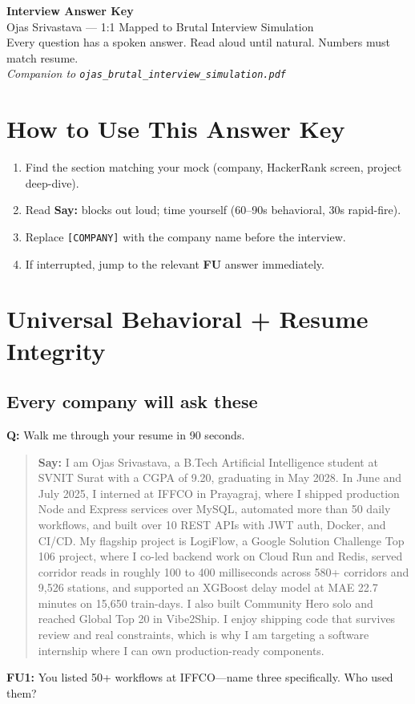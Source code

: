 \documentclass[9pt,a4paper]{article}
\begin{document}
\begin{center}
{\LARGE\bfseries Interview Answer Key}\\[4pt]
{\large Ojas Srivastava --- 1:1 Mapped to Brutal Interview Simulation}\\[2pt]
{\small Every question has a spoken answer. Read aloud until natural. Numbers must match resume.}\\[4pt]
{\color{acolor}\textit{Companion to \texttt{ojas\_brutal\_interview\_simulation.pdf}}}
\end{center}

\tableofcontents
\newpage

\section{How to Use This Answer Key}
\begin{enumerate}
  \item Find the section matching your mock (company, HackerRank screen, project deep-dive).
  \item Read \textbf{Say:} blocks out loud; time yourself (60--90s behavioral, 30s rapid-fire).
  \item Replace \texttt{[COMPANY]} with the company name before the interview.
  \item If interrupted, jump to the relevant \textbf{FU} answer immediately.
\end{enumerate}

\newpage
\section{Universal Behavioral + Resume Integrity}
\subsection{Every company will ask these}
\textbf{Q:} Walk me through your resume in 90 seconds.

\begin{quote}\small\textbf{Say:} I am Ojas Srivastava, a B.Tech Artificial Intelligence student at SVNIT Surat with a CGPA of 9.20, graduating in May 2028. In June and July 2025, I interned at IFFCO in Prayagraj, where I shipped production Node and Express services over MySQL, automated more than 50 daily workflows, and built over 10 REST APIs with JWT auth, Docker, and CI/CD. My flagship project is LogiFlow, a Google Solution Challenge Top 106 project, where I co-led backend work on Cloud Run and Redis, served corridor reads in roughly 100 to 400 milliseconds across 580+ corridors and 9,526 stations, and supported an XGBoost delay model at MAE 22.7 minutes on 15,650 train-days. I also built Community Hero solo and reached Global Top 20 in Vibe2Ship. I enjoy shipping code that survives review and real constraints, which is why I am targeting a software internship where I can own production-ready components.\end{quote}
\vspace{2mm}
\textbf{FU1:} You listed 50+ workflows at IFFCO---name three specifically. Who used them?
\end{document}
